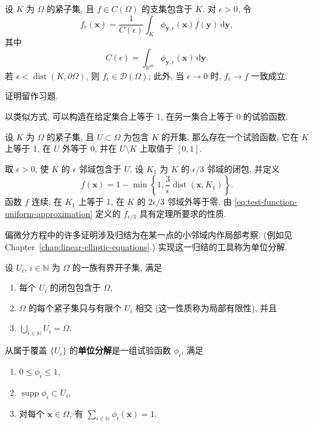\begin{Theorem}
\label{thm:test-functions-uniform-approximation}
设 $K$ 为 $\Omega$ 的紧子集, 且 $f\in C(\Omega)$ 的支集包含于 $K$. 对 $\epsilon>0$, 令
\begin{equation}\label{eq:test-function-uniform-approximation}
f_\epsilon(\bm{x})=\dfrac1{C(\epsilon)}\int_K\phi_{\bm{y},\epsilon}(\bm{x})f(\bm{y})\,\mathrm{d}\bm{y},
\end{equation}
其中
\begin{equation}\label{eq:test-function-bump-normalization}
C(\epsilon)=\int_{\mathbb{R}^m}\phi_{\bm{y},\epsilon}(\bm{x})\,\mathrm{d}\bm{y}.
\end{equation}
若 $\epsilon<\operatorname{dist}(K,\partial\Omega)$, 则 $f_\epsilon\in\mathcal{D}(\Omega)$; 此外, 当 $\epsilon\to0$ 时, $f_\epsilon\to f$ 一致成立.
\end{Theorem}

证明留作习题.

以类似方式, 可以构造在给定集合上等于 1, 在另一集合上等于 0 的试验函数.

\begin{Theorem}
\label{thm:smooth-cutoff}
设 $K$ 为 $\Omega$ 的紧子集, 且 $U\subset\Omega$ 为包含 $K$ 的开集. 那么存在一个试验函数, 它在 $K$ 上等于 1, 在 $U$ 外等于 0, 并在 $U\setminus K$ 上取值于 $[0,1]$.
\end{Theorem}

\begin{Proof}
取 $\epsilon>0$, 使 $K$ 的 $\epsilon$ 邻域包含于 $U$. 设 $K_1$ 为 $K$ 的 $\epsilon/3$ 邻域的闭包, 并定义
\begin{equation}\label{eq:continuous-neighborhood-cutoff}
f(\bm{x})=1-\min\left\{1,\dfrac3\epsilon\operatorname{dist}(\bm{x},K_1)\right\}.
\end{equation}
函数 $f$ 连续, 在 $K_1$ 上等于 1, 在 $K$ 的 $2\epsilon/3$ 邻域外等于零. 由 \eqref{eq:test-function-uniform-approximation} 定义的 $f_{\epsilon/3}$ 具有定理所要求的性质.
\end{Proof}

偏微分方程中的许多证明涉及归结为在某一点的小邻域内作局部考察. (例如见 Chapter~\ref{chap:linear-elliptic-equations}.) 实现这一归结的工具称为单位分解.

\begin{Definition}
\label{def:partition-of-unity}
设 $U_i$, $i\in\mathbb{N}$ 为 $\Omega$ 的一族有界开子集, 满足
\begin{enumerate}
\item 每个 $U_i$ 的闭包包含于 $\Omega$,
\item $\Omega$ 的每个紧子集只与有限个 $U_i$ 相交 (这一性质称为局部有限性), 并且
\item $\bigcup_{i\in\mathbb{N}}U_i=\Omega$.
\end{enumerate}
从属于覆盖 $\{U_i\}$ 的\textbf{单位分解}是一组试验函数 $\phi_i$, 满足
\begin{enumerate}
\item $0\leq\phi_i\leq1$,
\item $\operatorname{supp}\phi_i\subset U_i$,
\item 对每个 $\bm{x}\in\Omega$, 有 $\sum_{i\in\mathbb{N}}\phi_i(\bm{x})=1$.
\end{enumerate}
\end{Definition}

